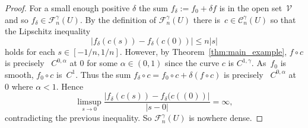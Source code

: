 \documentclass[12pt]{amsart}
\newcommand{\adj}{{precisely }} %
\numberwithin{equation}{section}
\theoremstyle{definition}
\theoremstyle{remark}
\begin{document}
\begin{proof}
For a small enough positive $\delta$
the sum $f_\delta:=f_0+\delta f$ 
is in the open set~$\mathcal V$ and
so $f_\delta \in  \mathcal F_n^\gamma (U)$.
%  
By the definition of $ \mathcal F_n^\gamma (U)$
there is~$c\in \mathcal C_n^\gamma  (U)$ so that
the Lipschitz inequality
\begin{equation*}
    |f_\delta(c(s)) - f_\delta(c(0))| \le n |s|
\end{equation*}
holds for each  $s\in[-1/n,1/n]$.
%
However, by Theorem~\ref{thm:main_example}, $f\circ c$ is \adj~$C^{0,\alpha}$
at $0$ for some $\alpha\in (0,1)$
since the curve $c$ is $C^{1,\gamma}$.
As~$f_0$ is smooth, $f_0\circ c$ is~$C^1$.
%
Thus the sum $f_\delta\circ c = f_0\circ c +  \delta ( f\circ c) $
is \adj~$C^{0,\alpha}$ at~$0$ where $\alpha<1$.
Hence 
\begin{equation*} 
   \limsup_{s\to 0}  \frac{|f_\delta(c(s)) -f_\delta(c((0))|}{|s-0|} = \infty, 
  \end{equation*} 
contradicting  the previous 
inequality.
So  $\mathcal F_n^\gamma (U)$ is nowhere dense.
\end{proof}  
\end{document}
